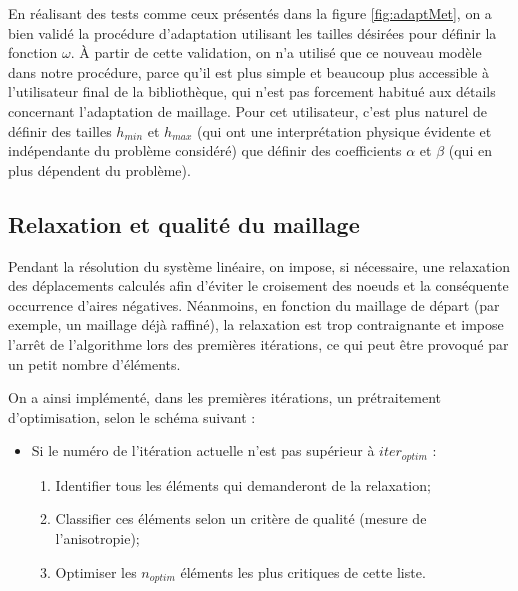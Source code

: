 \endgroup

\indent

\indent En réalisant des tests comme ceux présentés dans la figure \ref{fig:adaptMet}, on a bien validé la procédure d'adaptation utilisant les tailles désirées pour définir la fonction $\omega$. À partir de cette validation, on n'a utilisé que ce nouveau modèle dans notre procédure, parce qu'il est plus simple et beaucoup plus accessible à l'utilisateur final de la bibliothèque, qui n'est pas forcement habitué aux détails concernant l'adaptation de maillage. Pour cet utilisateur, c'est plus naturel de définir des tailles $h_{min}$ et $h_{max}$ (qui ont une interprétation physique évidente et indépendante du problème considéré) que définir des coefficients $\alpha$ et $\beta$ (qui en plus dépendent du problème). 


\subsection{Relaxation et qualité du maillage}

\indent Pendant la résolution du système linéaire, on impose, si nécessaire, une relaxation des déplacements calculés afin d'éviter le croisement des noeuds et la conséquente occurrence d'aires négatives. Néanmoins, en fonction du maillage de départ (par exemple, un maillage déjà raffiné), la relaxation est trop contraignante et impose l'arrêt de l'algorithme lors des premières itérations, ce qui peut être provoqué par un petit nombre d'éléments.

\indent On a ainsi implémenté, dans les premières itérations, un prétraitement d'optimisation, selon le schéma suivant :

\begin{itemize}
  \item Si le numéro de l'itération actuelle n'est pas supérieur à \(iter_{optim}\) : 
  \begin{enumerate}
    \item Identifier tous les éléments qui demanderont de la relaxation;
    \item Classifier ces éléments selon un critère de qualité (mesure de l'anisotropie);
    \item Optimiser les \(n_{optim}\) éléments les plus critiques de cette liste.
  \end{enumerate}   
\end{itemize}

